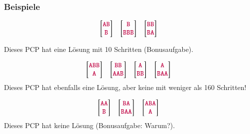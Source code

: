 \documentclass[onlymath]{beamer}
\begin{document}
\begin{frame}\frametitle{Beispiele}

 \[
\left[\begin{matrix}\mathtt{\textcolor{purple}{AB}}\\\mathtt{\textcolor{purple}{B}}\end{matrix}\right]\quad
\left[\begin{matrix}\mathtt{\textcolor{purple}{B}}\\\mathtt{\textcolor{purple}{BBB}}\end{matrix}\right]\quad
\left[\begin{matrix}\mathtt{\textcolor{purple}{BB}}\\\mathtt{\textcolor{purple}{BA}}\end{matrix}\right]
 \]

 \pause Dieses PCP hat eine Lösung mit 10 Schritten (Bonusaufgabe).\pause

\bigskip
\[
\left[\begin{matrix}\mathtt{\textcolor{purple}{ABB}}\\\mathtt{\textcolor{purple}{A}}\end{matrix}\right]\quad
\left[\begin{matrix}\mathtt{\textcolor{purple}{BB}}\\\mathtt{\textcolor{purple}{AAB}}\end{matrix}\right]\quad
\left[\begin{matrix}\mathtt{\textcolor{purple}{A}}\\\mathtt{\textcolor{purple}{BB}}\end{matrix}\right]\quad
\left[\begin{matrix}\mathtt{\textcolor{purple}{A}}\\\mathtt{\textcolor{purple}{BAA}}\end{matrix}\right]
 \] 
\pause Dieses PCP hat ebenfalls eine Lösung, aber keine mit weniger als 160 Schritten!\pause

\bigskip
\[
\left[\begin{matrix}\mathtt{\textcolor{purple}{AA}}\\\mathtt{\textcolor{purple}{B}}\end{matrix}\right]\quad
\left[\begin{matrix}\mathtt{\textcolor{purple}{BA}}\\\mathtt{\textcolor{purple}{BAA}}\end{matrix}\right]\quad
\left[\begin{matrix}\mathtt{\textcolor{purple}{ABA}}\\\mathtt{\textcolor{purple}{A}}\end{matrix}\right]
 \]
\pause Dieses PCP hat keine Lösung (Bonusaufgabe: Warum?).

\end{frame}
\end{document}

